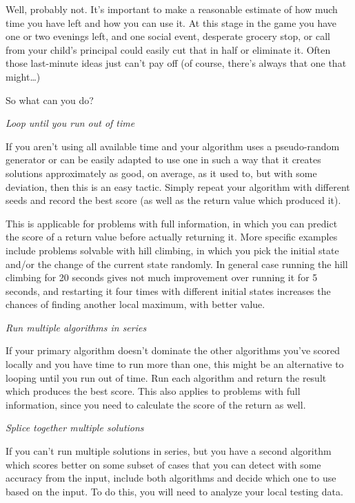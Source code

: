\documentclass[]{article}
\begin{document}
Well, probably not. It's important to make a reasonable estimate of how
much time you have left and how you can use it. At this stage in the
game you have one or two evenings left, and one social event, desperate
grocery stop, or call from your child's principal could easily cut that
in half or eliminate it. Often those last-minute ideas just can't pay
off (of course, there's always that one that might\ldots{})

So what can you do?

\emph{Loop until you run out of time}

If you aren't using all available time and your algorithm uses a
pseudo-random generator or can be easily adapted to use one in such a
way that it creates solutions approximately as good, on average, as it
used to, but with some deviation, then this is an easy tactic. Simply
repeat your algorithm with different seeds and record the best score (as
well as the return value which produced it).

This is applicable for problems with full information, in which you can
predict the score of a return value before actually returning it. More
specific examples include problems solvable with hill climbing, in which
you pick the initial state and/or the change of the current state
randomly. In general case running the hill climbing for 20 seconds gives
not much improvement over running it for 5 seconds, and restarting it
four times with different initial states increases the chances of
finding another local maximum, with better value.

\emph{Run multiple algorithms in series}

If your primary algorithm doesn't dominate the other algorithms you've
scored locally and you have time to run more than one, this might be an
alternative to looping until you run out of time. Run each algorithm and
return the result which produces the best score. This also applies to
problems with full information, since you need to calculate the score of
the return as well.

\emph{Splice together multiple solutions}

If you can't run multiple solutions in series, but you have a second
algorithm which scores better on some subset of cases that you can
detect with some accuracy from the input, include both algorithms and
decide which one to use based on the input. To do this, you will need to
analyze your local testing data.
\end{document}
